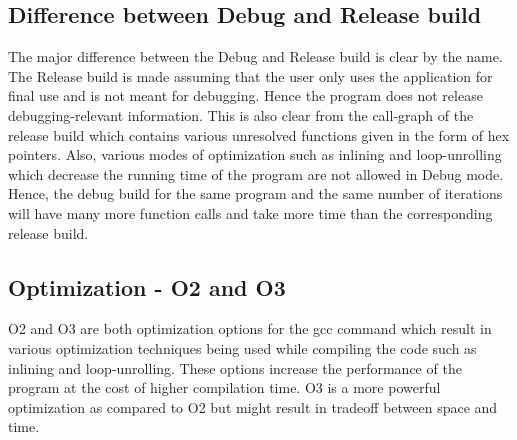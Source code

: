 \documentclass[11pt]{article}
\begin{document}
\subsection{Difference between Debug and Release build}
The major difference between the Debug and Release build is clear by the name. The Release build is made assuming that the user only uses the application for final use and is not meant for debugging. Hence the program does not release debugging-relevant information. This is also clear from the call-graph of the release build which contains various unresolved functions given in the form of hex pointers. Also, various modes of optimization such as inlining and loop-unrolling which decrease the running time of the program are not allowed in Debug mode. Hence, the debug build for the same program and the same number of iterations will have many more function calls and take more time than the corresponding release build.

\subsection{Optimization - O2 and O3}
O2 and O3 are both optimization options for the gcc command which result in various optimization techniques being used while compiling the code such as inlining and loop-unrolling. These options increase the performance of the program at the cost of higher compilation time. O3 is a more powerful optimization as compared to O2 but might result in tradeoff between space and time.



\end{document}
